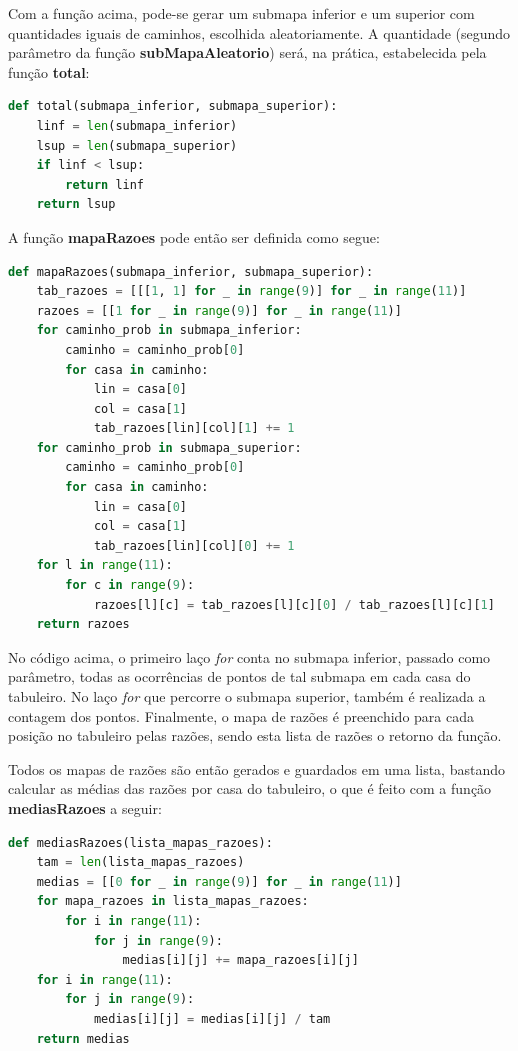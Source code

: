 \documentclass[12pt]{article}
\begin{document}
Com a função acima, pode-se gerar um submapa inferior e um superior com quantidades iguais de caminhos, escolhida aleatoriamente. A quantidade (segundo parâmetro da função \textbf{subMapaAleatorio}) será, na prática, estabelecida pela função \textbf{total}:

\begin{lstlisting}[language=Python]
def total(submapa_inferior, submapa_superior):
	linf = len(submapa_inferior)
	lsup = len(submapa_superior)
	if linf < lsup:
		return linf
	return lsup
\end{lstlisting}

A função \textbf{mapaRazoes} pode então ser definida como segue:

\begin{lstlisting}[language=Python]
def mapaRazoes(submapa_inferior, submapa_superior):
	tab_razoes = [[[1, 1] for _ in range(9)] for _ in range(11)] 
	razoes = [[1 for _ in range(9)] for _ in range(11)]
	for caminho_prob in submapa_inferior:
		caminho = caminho_prob[0]
		for casa in caminho:
			lin = casa[0]
			col = casa[1]
			tab_razoes[lin][col][1] += 1
	for caminho_prob in submapa_superior:
		caminho = caminho_prob[0]
		for casa in caminho:
			lin = casa[0]
			col = casa[1]
			tab_razoes[lin][col][0] += 1
	for l in range(11):
		for c in range(9):
			razoes[l][c] = tab_razoes[l][c][0] / tab_razoes[l][c][1]
	return razoes
\end{lstlisting}

No código acima, o primeiro laço \textit{for} conta no submapa inferior, passado como parâmetro, todas as ocorrências de pontos de tal submapa em cada casa do tabuleiro. No laço \textit{for} que percorre o submapa superior, também é realizada a contagem dos pontos. Finalmente, o mapa de razões é preenchido para cada posição no tabuleiro pelas razões, sendo esta lista de razões o retorno da função.

Todos os mapas de razões são então gerados e guardados em uma lista, bastando calcular as médias das razões por casa do tabuleiro, o que é feito com a função \textbf{mediasRazoes} a seguir:

\begin{lstlisting}[language=Python]
def mediasRazoes(lista_mapas_razoes):
	tam = len(lista_mapas_razoes)
	medias = [[0 for _ in range(9)] for _ in range(11)]
	for mapa_razoes in lista_mapas_razoes:
		for i in range(11):
			for j in range(9):
				medias[i][j] += mapa_razoes[i][j]
	for i in range(11):
		for j in range(9):
			medias[i][j] = medias[i][j] / tam
	return medias
\end{lstlisting}
\end{document}
